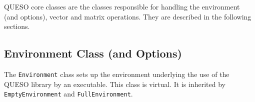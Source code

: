 QUESO core classes are the classes responsible for handling the environment (and options), vector
and matrix operations. They are described in the following sections.

% 
% 
% 
% 
% 
% 


\subsection{Environment Class (and Options)}\label{sec:environment_class}

%
The \texttt{Environment} class sets up the environment underlying the use of
the QUESO library by an executable.  This class is virtual. It is inherited by
\verb+EmptyEnvironment+ and \verb+FullEnvironment+.

